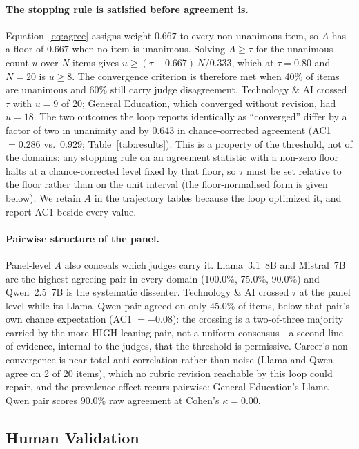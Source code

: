 \documentclass[letterpaper]{article}
\begin{document}
\paragraph{The stopping rule is satisfied before agreement is.}
Equation~\ref{eq:agree} assigns weight $0.667$ to every non-unanimous item, so
$A$ has a floor of $0.667$ when no item is unanimous. Solving
$A \geq \tau$ for the unanimous count $u$ over $N$ items gives
$u \geq (\tau - 0.667)\,N / 0.333$, which at $\tau = 0.80$ and $N = 20$ is
$u \geq 8$. The convergence criterion is therefore met when 40\% of items are
unanimous and 60\% still carry judge disagreement. Technology \& AI crossed $\tau$ with $u = 9$ of 20; General Education, which
converged without revision, had $u = 18$. The two outcomes the loop reports identically as ``converged'' differ by a
factor of two in unanimity and by $0.643$ in chance-corrected agreement
(AC1 $=0.286$ vs.\ $0.929$; Table~\ref{tab:results}). This is a property of
the threshold, not of the domains: any stopping rule on an agreement statistic
with a non-zero floor halts at a chance-corrected level fixed by that floor,
so $\tau$ must be set relative to the floor rather than on the unit interval
(the floor-normalised form is given below). We retain $A$ in the trajectory
tables because the loop optimized it, and report AC1 beside every value.

\paragraph{Pairwise structure of the panel.}
Panel-level $A$ also conceals which judges carry it. Llama~3.1~8B and
Mistral~7B are the highest-agreeing pair in every domain (100.0\%, 75.0\%,
90.0\%) and Qwen~2.5~7B is the systematic dissenter. Technology \& AI crossed
$\tau$ at the panel level while its Llama--Qwen pair agreed on only 45.0\% of
items, below that pair's own chance expectation (AC1 $=-0.08$): the crossing
is a two-of-three majority carried by the more HIGH-leaning pair, not a
uniform consensus---a second line of evidence, internal to the judges, that
the threshold is permissive. Career's non-convergence is near-total
anti-correlation rather than noise (Llama and Qwen agree on 2 of 20 items),
which no rubric revision reachable by this loop could repair, and the
prevalence effect recurs pairwise: General Education's Llama--Qwen pair scores
90.0\% raw agreement at Cohen's $\kappa = 0.00$.


\subsection{Human Validation}
\label{sec:humanval}
\end{document}
